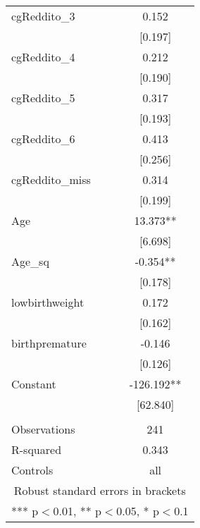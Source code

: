 \documentclass[]{article}
\begin{document}
\begin{tabular}{lc}
cgReddito\_3 & 0.152 \\
 & [0.197] \\
cgReddito\_4 & 0.212 \\
 & [0.190] \\
cgReddito\_5 & 0.317 \\
 & [0.193] \\
cgReddito\_6 & 0.413 \\
 & [0.256] \\
cgReddito\_miss & 0.314 \\
 & [0.199] \\
Age & 13.373** \\
 & [6.698] \\
Age\_sq & -0.354** \\
 & [0.178] \\
lowbirthweight & 0.172 \\
 & [0.162] \\
birthpremature & -0.146 \\
 & [0.126] \\
Constant & -126.192** \\
 & [62.840] \\
 &  \\
Observations & 241 \\
R-squared & 0.343 \\
 Controls & all \\ \hline
\multicolumn{2}{c}{ Robust standard errors in brackets} \\
\multicolumn{2}{c}{ *** p$<$0.01, ** p$<$0.05, * p$<$0.1} \\
\end{tabular}
\end{document}
